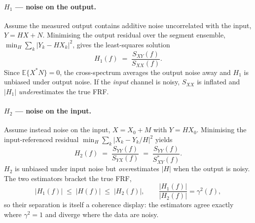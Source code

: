 \paragraph{$H_1$ — noise on the output.}
Assume the measured output contains additive noise uncorrelated with the
input, $Y = H X + N$. Minimising the output residual over the segment
ensemble,
$\min_H \sum_k |Y_k - H X_k|^2$, gives the least-squares solution
\begin{equation}
  H_1(f) \;=\; \frac{S_{XY}(f)}{S_{XX}(f)} .
  \label{eq:H1}
\end{equation}
Since $\mathbb{E}\{X^* N\} = 0$, the cross-spectrum averages the output noise
away and $H_1$ is unbiased under output noise. If the \emph{input} channel is
noisy, $S_{XX}$ is inflated and $|H_1|$ \emph{under}estimates the true FRF.

\paragraph{$H_2$ — noise on the input.}
Assume instead noise on the input, $X = X_0 + M$ with $Y = H X_0$.
Minimising the input-referenced residual
$\min_H \sum_k |X_k - Y_k / H|^2$ yields
\begin{equation}
  H_2(f) \;=\; \frac{S_{YY}(f)}{S_{YX}(f)}
        \;=\; \frac{S_{YY}(f)}{S_{XY}^*(f)} .
  \label{eq:H2}
\end{equation}
$H_2$ is unbiased under input noise but \emph{over}estimates $|H|$ when the
output is noisy. The two estimators bracket the true FRF,
\begin{equation}
  |H_1(f)| \;\le\; |H(f)| \;\le\; |H_2(f)|,
  \qquad
  \frac{|H_1(f)|}{|H_2(f)|} = \gamma^2(f),
  \label{eq:bracket}
\end{equation}
so their separation is itself a coherence display: the estimators agree
exactly where $\gamma^2 = 1$ and diverge where the data are noisy.


